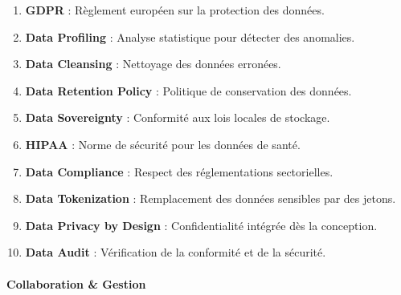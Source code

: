 \documentclass[
  letterpaper,
  DIV=11,
  numbers=noendperiod]{scrartcl}
\makeatletter
\let\oldparagraph\paragraph
\renewcommand{\paragraph}{
    \@ifstar
      \xxxParagraphStar
      \xxxParagraphNoStar
  }
\newcommand{\xxxParagraphStar}[1]{\oldparagraph*{#1}\mbox{}}
\newcommand{\xxxParagraphNoStar}[1]{\oldparagraph{#1}\mbox{}}
\providecommand{\tightlist}{%
  \setlength{\itemsep}{0pt}\setlength{\parskip}{0pt}}\usepackage{longtable,booktabs,array}
\makeatother
\begin{document}
\begin{enumerate}
\def\labelenumi{\arabic{enumi}.}
\setcounter{enumi}{30}
\tightlist
\item
  \textbf{GDPR} : Règlement européen sur la protection des données.\\
\item
  \textbf{Data Profiling} : Analyse statistique pour détecter des
  anomalies.\\
\item
  \textbf{Data Cleansing} : Nettoyage des données erronées.\\
\item
  \textbf{Data Retention Policy} : Politique de conservation des
  données.\\
\item
  \textbf{Data Sovereignty} : Conformité aux lois locales de stockage.\\
\item
  \textbf{HIPAA} : Norme de sécurité pour les données de santé.\\
\item
  \textbf{Data Compliance} : Respect des réglementations sectorielles.\\
\item
  \textbf{Data Tokenization} : Remplacement des données sensibles par
  des jetons.\\
\item
  \textbf{Data Privacy by Design} : Confidentialité intégrée dès la
  conception.\\
\item
  \textbf{Data Audit} : Vérification de la conformité et de la sécurité.
\end{enumerate}

\paragraph{\texorpdfstring{\textbf{Collaboration \&
Gestion}}{Collaboration \& Gestion}}\label{collaboration-gestion-1}
\end{document}
